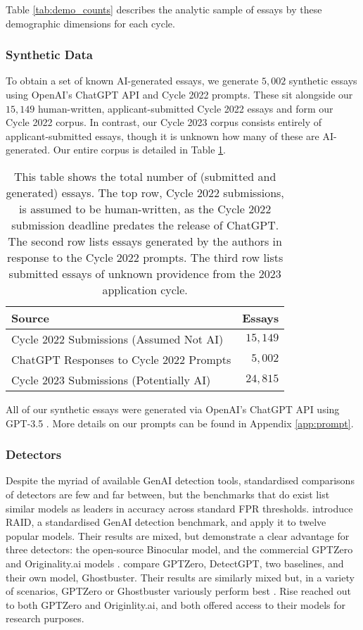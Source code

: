 Table \ref{tab:demo_counts} describes the analytic sample of essays by these demographic dimensions for each cycle. 

\subsubsection{Synthetic Data}\label{sssec:chatgpt}
To obtain a set of known AI-generated essays, we generate $5,002$ synthetic essays using OpenAI's ChatGPT API and Cycle 2022 prompts. These sit alongside our $15,149$ human-written, applicant-submitted Cycle 2022 essays and form our Cycle 2022 corpus. In contrast, our Cycle 2023 corpus consists entirely of applicant-submitted essays, though it is unknown how many of these are AI-generated. Our entire corpus is detailed in Table \ref{tab:cycle_counts}.

\begin{table}[htbp]
  \centering
  \caption{This table shows the total number of (submitted and generated) essays. The top row, Cycle 2022 submissions, is assumed to be human-written, as the Cycle 2022 submission deadline predates the release of ChatGPT. The second row lists essays generated by the authors in response to the Cycle 2022 prompts. The third row lists submitted essays of unknown providence from the 2023 application cycle.}
  \label{tab:cycle_counts}
  \begin{tabular}{ l r }
      \toprule
      Source  & Essays \\
      \midrule
      Cycle 2022 Submissions (Assumed Not AI) & $15,149$ \\
      ChatGPT Responses to Cycle 2022 Prompts & $5,002$ \\
      Cycle 2023 Submissions (Potentially AI) & $24,815$ \\
      \bottomrule
  \end{tabular}
\end{table}

All of our synthetic essays were generated via OpenAI's ChatGPT API using GPT-3.5 \cite{brown_language_2020}. More details on our prompts can be found in Appendix \ref{app:prompt}.

\subsubsection{Detectors}\label{sssec:detectors}
Despite the myriad of available GenAI detection tools, standardised comparisons of detectors are few and far between, but the benchmarks that do exist list similar models as leaders in accuracy across standard FPR thresholds. \textcite{dugan_raid_2024} introduce RAID, a standardised GenAI detection benchmark, and apply it to twelve popular models. Their results are mixed, but demonstrate a clear advantage for three detectors: the open-source Binocular model, and the commercial GPTZero and Originality.ai models \cite{dugan_raid_2024}. \textcite{verma_ghostbuster_2023} compare GPTZero, DetectGPT, two baselines, and their own model, Ghostbuster. Their results are similarly mixed but, in a variety of scenarios, GPTZero or Ghostbuster variously perform best \cite{verma_ghostbuster_2023}. Rise reached out to both GPTZero and Originlity.ai, and both offered access to their models for research purposes.

